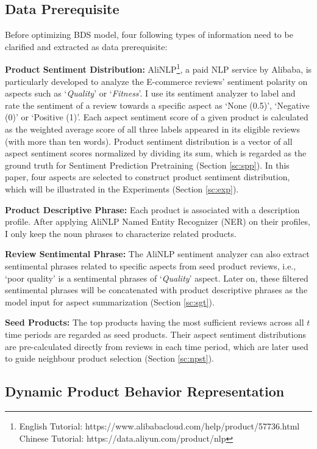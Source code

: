 \subsection{Data Prerequisite} \label{sc:dp}

Before optimizing BDS model, four following types of information need to be clarified and extracted as data prerequisite:

\textbf{Product Sentiment Distribution:} AliNLP\footnote{English Tutorial: https://www.alibabacloud.com/help/product/57736.html \\ Chinese Tutorial: https://data.aliyun.com/product/nlp}, a paid NLP service by Alibaba, is particularly developed to analyze the E-commerce reviews' sentiment polarity on aspects such as `\textit{Quality}' or `\textit{Fitness}'. I use its sentiment analyzer to label and rate the sentiment of a review towards a specific aspect as `None (0.5)', `Negative (0)' or `Positive (1)'. Each aspect sentiment score of a given product is calculated as the weighted average score of all three labels appeared in its eligible reviews (with more than ten words). Product sentiment distribution is a vector of all aspect sentiment scores normalized by dividing its sum, which is regarded as the ground truth for Sentiment Prediction Pretraining (Section \ref{sc:spp}). In this paper, four aspects are selected to construct product sentiment distribution, which will be illustrated in the Experiments (Section \ref{sc:exp}).

\textbf{Product Descriptive Phrase:} Each product is associated with a description profile. After applying AliNLP Named Entity Recognizer (NER) on their profiles, I only keep the noun phrases to characterize related products.

\textbf{Review Sentimental Phrase:} The AliNLP sentiment analyzer can also extract sentimental phrases related to specific aspects from seed product reviews, i.e., `poor quality' is a sentimental phrases of `\textit{Quality}' aspect. Later on, these filtered sentimental phrases will be concatenated with product descriptive phrases as the model input for aspect summarization (Section \ref{sc:sgt}).

\textbf{Seed Products:} The top products having the most sufficient reviews across all $t$ time periods are regarded as seed products. Their aspect sentiment distributions are pre-calculated directly from reviews in each time period, which are later used to guide neighbour product selection (Section \ref{sc:npst}). 

\subsection{Dynamic Product Behavior Representation} \label{sc:dpbr}

